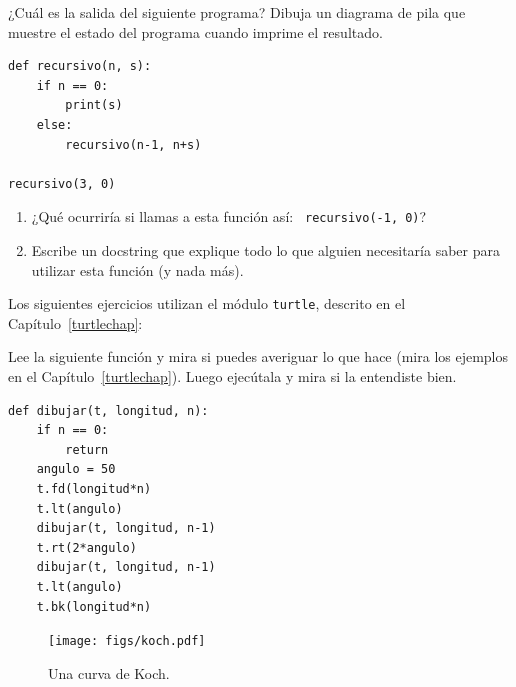 \documentclass[10pt]{book}
\begin{document}
\begin{exercise}
¿Cuál es la salida del siguiente programa?
Dibuja un diagrama de pila que muestre el estado del programa
cuando imprime el resultado.

\begin{verbatim}
def recursivo(n, s):
    if n == 0:
        print(s)
    else:
        recursivo(n-1, n+s)

recursivo(3, 0)
\end{verbatim}

\begin{enumerate}

\item ¿Qué ocurriría si llamas a esta función así: {\tt
  recursivo(-1, 0)}?

\item Escribe un docstring que explique todo lo que alguien necesitaría
  saber para utilizar esta función (y nada más).

\end{enumerate}

\end{exercise}


Los siguientes ejercicios utilizan el módulo {\tt turtle}, descrito en el
Capítulo~\ref{turtlechap}:

\begin{exercise}

Lee la siguiente función y mira si puedes averiguar
lo que hace (mira los ejemplos en el Capítulo~\ref{turtlechap}).  Luego ejecútala
y mira si la entendiste bien.

\begin{verbatim}
def dibujar(t, longitud, n):
    if n == 0:
        return
    angulo = 50
    t.fd(longitud*n)
    t.lt(angulo)
    dibujar(t, longitud, n-1)
    t.rt(2*angulo)
    dibujar(t, longitud, n-1)
    t.lt(angulo)
    t.bk(longitud*n)
\end{verbatim}

\end{exercise}


\begin{figure}
\centerline
{\texttt{[image: figs/koch.pdf]}}
\caption{Una curva de Koch.}
\label{fig.koch}
\end{figure}
\end{document}
